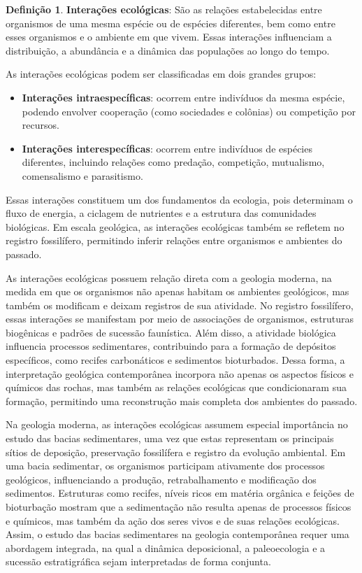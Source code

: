 \documentclass[a4paper,12pt]{article}
\theoremstyle{definition}
\theoremstyle{definition}
\theoremstyle{definition}
\newtheorem{definicao}{Definição}[section]
\begin{document}
\begin{definicao}
\textbf{Interações ecológicas}: São as relações estabelecidas entre organismos de uma mesma espécie ou de espécies diferentes, bem como entre esses organismos e o ambiente em que vivem. Essas interações influenciam a distribuição, a abundância e a dinâmica das populações ao longo do tempo.
\end{definicao}

As interações ecológicas podem ser classificadas em dois grandes grupos:

\begin{itemize}
    \item \textbf{Interações intraespecíficas}: ocorrem entre indivíduos da mesma espécie, podendo envolver cooperação (como sociedades e colônias) ou competição por recursos.
    
    \item \textbf{Interações interespecíficas}: ocorrem entre indivíduos de espécies diferentes, incluindo relações como predação, competição, mutualismo, comensalismo e parasitismo.
\end{itemize}

Essas interações constituem um dos fundamentos da ecologia, pois determinam o fluxo de energia, a ciclagem de nutrientes e a estrutura das comunidades biológicas. Em escala geológica, as interações ecológicas também se refletem no registro fossilífero, permitindo inferir relações entre organismos e ambientes do passado.

As interações ecológicas possuem relação direta com a geologia moderna, na medida em que os organismos não apenas habitam os ambientes geológicos, mas também os modificam e deixam registros de sua atividade. No registro fossilífero, essas interações se manifestam por meio de associações de organismos, estruturas biogênicas e padrões de sucessão faunística. Além disso, a atividade biológica influencia processos sedimentares, contribuindo para a formação de depósitos específicos, como recifes carbonáticos e sedimentos bioturbados. Dessa forma, a interpretação geológica contemporânea incorpora não apenas os aspectos físicos e químicos das rochas, mas também as relações ecológicas que condicionaram sua formação, permitindo uma reconstrução mais completa dos ambientes do passado.

Na geologia moderna, as interações ecológicas assumem especial importância no estudo das bacias sedimentares, uma vez que estas representam os principais sítios de deposição, preservação fossilífera e registro da evolução ambiental. Em uma bacia sedimentar, os organismos participam ativamente dos processos geológicos, influenciando a produção, retrabalhamento e modificação dos sedimentos. Estruturas como recifes, níveis ricos em matéria orgânica e feições de bioturbação mostram que a sedimentação não resulta apenas de processos físicos e químicos, mas também da ação dos seres vivos e de suas relações ecológicas. Assim, o estudo das bacias sedimentares na geologia contemporânea requer uma abordagem integrada, na qual a dinâmica deposicional, a paleoecologia e a sucessão estratigráfica sejam interpretadas de forma conjunta.
\end{document}
